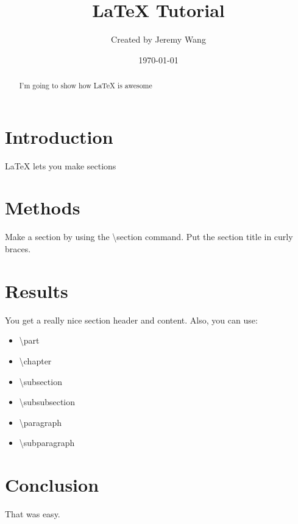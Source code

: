 \documentclass[12pt]{article}
\title{\LaTeX{} Tutorial}
\author{Created by Jeremy Wang}
\date{\today}
\begin{document}
  \maketitle

  \begin{abstract}
    I'm going to show how \LaTeX{} is awesome
  \end{abstract}

  \tableofcontents

  \section{Introduction}
    \LaTeX{} lets you make sections
  
  \section{Methods}
    Make a section by using the \textbackslash{}section command. Put the section title in curly braces.

  \section{Results}
    You get a really nice section header and content.
    Also, you can use:
    \begin{itemize}
      \item \textbackslash{}part
      \item \textbackslash{}chapter
      \item \textbackslash{}subsection
      \item \textbackslash{}subsubsection
      \item \textbackslash{}paragraph
      \item \textbackslash{}subparagraph
    \end{itemize}

  \section{Conclusion}
    That was easy.
\end{document}
